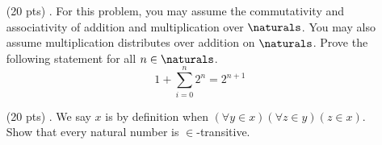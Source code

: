 \begin{enumerate}
  \item[(20 pts) \quad 4.]
    For this problem, you may assume the commutativity and associativity of addition and multiplication over $\naturals$.
    You may also assume multiplication distributes over addition on $\naturals$.
    Prove the following statement for all $n \in \naturals$.
    \begin{equation*}
      1 + \sum_{i = 0}^{n} 2^n = 2^{n + 1}
    \end{equation*}

  \item[(20 pts) \quad 5.]
    We say $x$ is  by definition when $(\forall y \in x)(\forall z \in y)(z \in x)$. \\
    Show that every natural number is $\in$-transitive.
\end{enumerate}


